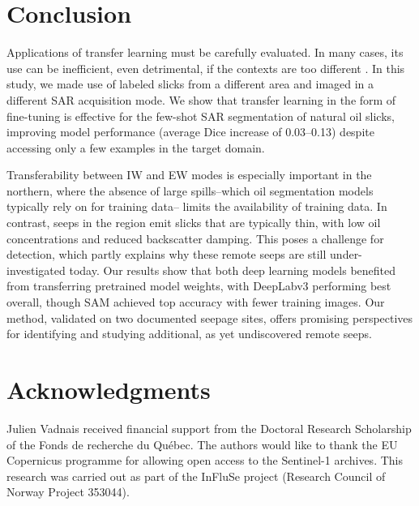 \documentclass[lettersize,journal]{IEEEtran}
\begin{document}
\section{Conclusion}
Applications of transfer learning must be carefully evaluated. In many cases, its use can be inefficient, even detrimental, if the contexts are too different \cite{mensinkFactorsInfluenceTransfer2022}.
In this study, we made use of labeled slicks from a different area and imaged in a different SAR acquisition mode. We show that transfer learning in the form of fine-tuning is effective for the few-shot SAR segmentation
of natural oil slicks, improving model performance (average Dice increase of 0.03--0.13) despite accessing only a few examples in the target domain.

Transferability between IW and EW modes is especially important in the northern, where the absence of large spills--which oil segmentation models typically rely on for training data-- 
limits the availability of training data. In contrast, seeps in the region emit slicks that are typically thin, with low oil concentrations and reduced backscatter damping.
This poses a challenge for detection, which partly explains why these remote seeps are still under-investigated today. Our results show that both deep learning models benefited from transferring pretrained model weights, 
with DeepLabv3 performing best overall, though SAM achieved top accuracy with fewer training images. Our method, validated on two documented seepage sites, offers promising perspectives for
identifying and studying additional, as yet undiscovered remote seeps.

\section*{Acknowledgments}
Julien Vadnais received financial support from the Doctoral Research Scholarship of the Fonds de recherche du Québec. 
The authors would like to thank the EU Copernicus programme for allowing open access to the Sentinel-1 archives.
This research was carried out as part of the InFluSe project (Research Council of Norway Project 353044).


\end{document}
